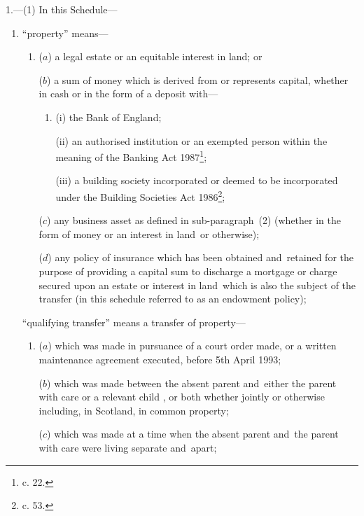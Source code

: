 \documentclass[12pt,a4paper]{article}
\begin{document}
1.—(1) In this Schedule—
\begin{enumerate}\item[]
“property” means—
\begin{enumerate}\item[]
($a$) a legal estate or an equitable interest in land; or

($b$) a sum of money which is derived from or represents capital, whether in cash or in the form of a deposit with—
\begin{enumerate}\item[]
(i) the Bank of England;

(ii) an authorised institution or an exempted person within the meaning of the Banking Act 1987\footnote{ c. 22.};

(iii) a building society incorporated or deemed to be incorporated under the Building Societies Act 1986\footnote{ c. 53.};
\end{enumerate}

\begin{sloppypar}
($c$) any business asset as defined in sub-paragraph~(2) (whether in the form of money or an interest in land~or otherwise);
\end{sloppypar}

($d$) any policy of insurance which has been obtained and~retained for the purpose of providing a capital sum to discharge a mortgage or charge secured upon an estate or interest in land~which is also the subject of the transfer (in this schedule referred to as an endowment policy);
\end{enumerate}

“qualifying transfer” means a transfer of property—
\begin{enumerate}\item[]
($a$) which was made in pursuance of a court order made, or a written maintenance agreement executed, before 5th April 1993;

($b$) which was made between the absent parent and~either the parent with care or a relevant child%
, or both whether jointly or otherwise including, in Scotland, in common property;  %

($c$) which was made at a time when the absent parent and~the parent with care were living separate and~apart;



\end{enumerate}
\end{enumerate}
\end{document}
